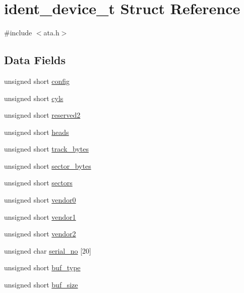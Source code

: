 \hypertarget{structident__device__t}{}\section{ident\+\_\+device\+\_\+t Struct Reference}
\label{structident__device__t}


{\ttfamily \#include $<$ata.\+h$>$}

\subsection*{Data Fields}
\begin{DoxyCompactItemize}
\item 
unsigned short \hyperlink{structident__device__t_a244665cc61b5b3e5fcec35242a01fc9b}{config}
\item 
unsigned short \hyperlink{structident__device__t_a99303affca63361d7b97f40fd29b1028}{cyls}
\item 
unsigned short \hyperlink{structident__device__t_ab16b1b188cf48d9f8e7b510e3eb9933c}{reserved2}
\item 
unsigned short \hyperlink{structident__device__t_abe75fc82f62aeb25eeeaebc14832cee5}{heads}
\item 
unsigned short \hyperlink{structident__device__t_ac5bfb23af07632fcb7ab55872b7e8839}{track\+\_\+bytes}
\item 
unsigned short \hyperlink{structident__device__t_a65aac348597065dd666c8d17d5436cfe}{sector\+\_\+bytes}
\item 
unsigned short \hyperlink{structident__device__t_a0936bf38dc570c2117003696aef259ab}{sectors}
\item 
unsigned short \hyperlink{structident__device__t_ad4057b661fe03727c4c8c5c131beba91}{vendor0}
\item 
unsigned short \hyperlink{structident__device__t_a690a82fc5e0d922b28a2706e57298ef0}{vendor1}
\item 
unsigned short \hyperlink{structident__device__t_a9d34132aa72f1591baa59ce870e626e1}{vendor2}
\item 
unsigned char \hyperlink{structident__device__t_aa2f154afca4db0b73806e565ecf79bfb}{serial\+\_\+no} \mbox{[}20\mbox{]}
\item 
unsigned short \hyperlink{structident__device__t_aa631ed68393ce9dcc8dfac663441a14d}{buf\+\_\+type}
\item 
unsigned short \hyperlink{structident__device__t_a2b96de1287d6347279fb208225262974}{buf\+\_\+size}
\item 

\end{DoxyCompactItemize}
